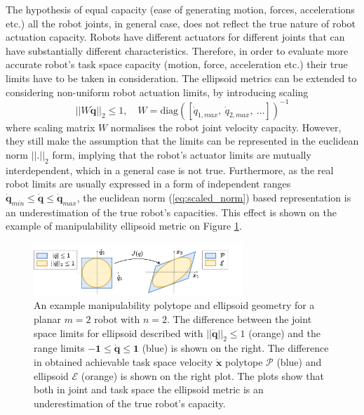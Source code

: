 The hypothesis of equal capacity (ease of generating motion, forces, accelerations etc.) all the robot joints, in general case, does not reflect the true nature of robot actuation capacity. Robots have different actuators for different joints that can have substantially different characteristics. Therefore, in order to evaluate more accurate robot's task space capacity (motion, force, acceleration etc.) their true limits have to be taken in consideration. The ellipsoid metrics can be extended to considering non-uniform robot actuation limits, by introducing scaling
\begin{equation}
    ||W\dot{\bm{q}}||_2 \leq 1, \quad W=\text{diag}\left(\left[\dot{q}_{1,max} ,~\dot{q}_{2,max} , ~\ldots\right]\right)^{-1}
    \label{eq:scaled_norm}
\end{equation}    
where scaling matrix $W$ normalises the robot joint velocity capacity. However, they still make the assumption that the limits can be represented in the euclidean norm  $||.||_2$ form, implying that the robot's actuator limits are mutually interdependent, which in a general case is not true\cite{Lee1997manip}. Furthermore, as the real robot limits are usually expressed in a form of independent ranges $ \dot{\bm{q}}_{min} \leq \dot{\bm{q}} \leq \dot{\bm{q}}_{max}$, the euclidean norm (\ref{eq:scaled_norm}) based representation is an underestimation of the true robot's capacities. This effect is shown on the example of manipulability ellipsoid metric on Figure \ref{fig:ellip_poly_dif}. 

\begin{figure}
    \centering
    \includegraphics[width=0.7\textwidth]{Chapters/imgs/ellip_poly.pdf}
    \caption{An example manipulability polytope and ellipsoid geometry for a planar $m=2$ robot with $n=2$. The difference between the joint space limits for ellipsoid described with $||\dot{\bm{q}}||_2\leq1$ (orange) and the range limits $\bm{-1}\leq\dot{\bm{q}}\leq\bm{1}$ (blue) is shown on the right. The difference in obtained achievable task space velocity $\dot{\bm{x}}$ polytope $\mathcal{P}$ (blue) and ellipsoid $\mathcal{E}$ (orange) is shown on the right plot. The plots show that both in joint and task space the ellipsoid metric is an underestimation of the true robot's capacity.}
    \label{fig:ellip_poly_dif}
\end{figure}

